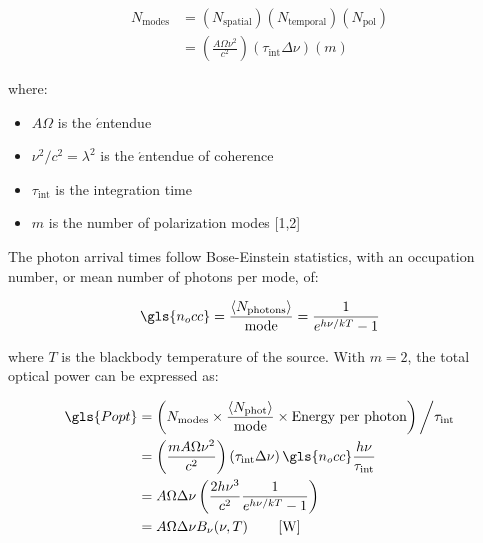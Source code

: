 \begin{equation}
 \begin{aligned}
  N_{\mathrm{modes}} &= \left( N_{\mathrm{spatial}} \right) \left( N_{\mathrm{temporal}} \right) \left( N_{\mathrm{pol}} \right) \\
            &= \left( \frac{A\Omega\nu^{2}}{c^{2}} \right) \left(\tau_{\mathrm{int}}\Delta \nu \right) \left(m\right)
  \end{aligned}
\end{equation}

where:
\begin{itemize}[label={},nosep]
  \item $A\Omega$ is the $\acute{e}$ntendue
  \item $\nu^{2}/c^{2} = \lambda^{2}$ is the $\acute{e}$ntendue of coherence
  \item $\tau_{\mathrm{int}}$ is the integration time
  \item $m$ is the number of polarization modes [1,2]
\end{itemize}

The photon arrival times follow Bose-Einstein statistics, with an occupation number, or mean number of photons per mode, of:

\begin{equation}
  \gls{n_occ} = \frac{\left< N_{\mathrm{photons}} \right> }{\mathrm{mode}} = \frac{1}{e^{h\nu/kT} - 1}
\end{equation}

where $T$ is the blackbody temperature of the source. With $m = 2$, the total optical power can be expressed as:

\begin{equation}\label{eq:P_opt}
 \begin{aligned}
  \gls{Popt} &= \left( N_{\mathrm{modes}} \times  \frac{\left< N_{\mathrm{phot}} \right>}{\mathrm{mode}} \times  \textrm{Energy per photon} \right) \bigg/ \tau_{\mathrm{int}} \\
          &= \left( \frac{m A\Omega\nu^{2}}{c^{2}} \right) \left(\tau_{\mathrm{int}}\Delta \nu \right)  \gls{n_occ} \frac{h\nu}{\tau_{\mathrm{int}}} \\
          &= A\Omega\Delta\nu \left( \frac{2h\nu^{3}}{c^{2}}\frac{1}{e^{h\nu/kT} - 1} \right) \\
          &= A\Omega\Delta\nu B_{\nu}(\nu, T) \qquad \left[ \mathrm{W} \right]
  \end{aligned}
\end{equation}

